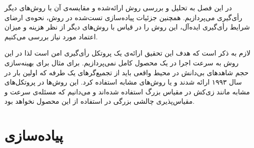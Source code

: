 در این فصل به تحلیل و بررسی روش ارائه‌شده و مقایسه‌ی آن با روش‌های دیگر رأی‌گیری می‌پردازیم. همچنین جزئیات پیاده‌سازی تست‌شده در روش، نحوه‌ی ارضای شرایط رأی‌گیری ایده‌آل، این روش را در قیاس با روش‌های دیگر از نظر هزینه و میزان اعتماد مورد نیاز بررسی می‌کنیم. 
\par
لازم به ذکر است که هدف این تحقیق ارائه‌ی یک پروتکل رأی‌گیری امن است لذا در این روش به سرعت اجرا در یک محصول کامل نمی‌پردازیم. برای مثال برای بهینه‌سازی حجم شاهد‌های بی‌دانش در محیط واقعی باید از تجمیع‌گر‌های یک طرفه 
که اولین بار در سال ۱۹۹۳ 
\cite{oneway}
ارائه شدند و یا روش‌های مشابه استفاده کرد. این روش‌ها در پروتکل‌های مشابه مانند زی‌کش در مقیاس بزرگ استفاده‌ شده‌اند و می‌دانیم که مسئله‌ی سرعت و مقیاس‌پذیری چالشی بزرگی در استفاده از این محصول نخواهد بود.

\section{پیاده‌سازی}

